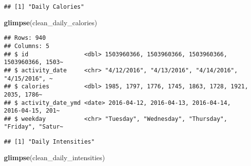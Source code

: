 \documentclass[
]{article}
\newenvironment{Shaded}{\begin{snugshade}}{\end{snugshade}}
\newcommand{\FunctionTok}[1]{\textcolor[rgb]{0.13,0.29,0.53}{\textbf{#1}}}
\newcommand{\NormalTok}[1]{#1}
\newcommand{\OtherTok}[1]{\textcolor[rgb]{0.56,0.35,0.01}{#1}}
\newcommand{\SpecialCharTok}[1]{\textcolor[rgb]{0.81,0.36,0.00}{\textbf{#1}}}
\newcommand{\StringTok}[1]{\textcolor[rgb]{0.31,0.60,0.02}{#1}}
\begin{document}
\begin{Shaded}
\end{Shaded}

\begin{verbatim}
## [1] "Daily Calories"
\end{verbatim}

\begin{Shaded}
\begin{Highlighting}[]
\FunctionTok{glimpse}\NormalTok{(clean\_daily\_calories)}
\end{Highlighting}
\end{Shaded}

\begin{verbatim}
## Rows: 940
## Columns: 5
## $ id                <dbl> 1503960366, 1503960366, 1503960366, 1503960366, 1503~
## $ activity_date     <chr> "4/12/2016", "4/13/2016", "4/14/2016", "4/15/2016", ~
## $ calories          <dbl> 1985, 1797, 1776, 1745, 1863, 1728, 1921, 2035, 1786~
## $ activity_date_ymd <date> 2016-04-12, 2016-04-13, 2016-04-14, 2016-04-15, 201~
## $ weekday           <chr> "Tuesday", "Wednesday", "Thursday", "Friday", "Satur~
\end{verbatim}

\begin{Shaded}
\end{Shaded}

\begin{verbatim}
## [1] "Daily Intensities"
\end{verbatim}

\begin{Shaded}
\begin{Highlighting}[]
\FunctionTok{glimpse}\NormalTok{(clean\_daily\_intensities)}
\end{Highlighting}
\end{Shaded}
\end{document}
